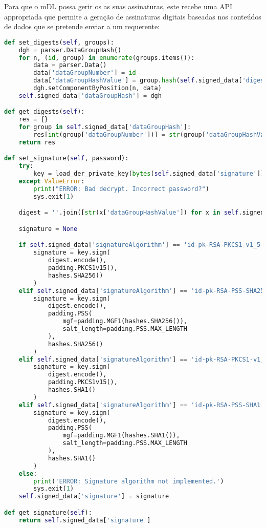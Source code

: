 Para que o mDL possa gerir os as suas assinaturas, este recebe uma API appropriada que permite a geração de assinaturas digitais baseadas nos conteúdos de dados que se pretende enviar a um requerente:

\begin{lstlisting}[caption=Gestão de digests e assinaturas no EF.SOD, language=Python]
    def set_digests(self, groups):
    dgh = parser.DataGroupHash()
    for n, (id, group) in enumerate(groups.items()):
        data = parser.Data()
        data['dataGroupNumber'] = id
        data['dataGroupHashValue'] = group.hash(self.signed_data['digestAlgorithm'])
        dgh.setComponentByPosition(n, data)
    self.signed_data['dataGroupHash'] = dgh

def get_digests(self):
    res = {}
    for group in self.signed_data['dataGroupHash']:
        res[int(group['dataGroupNumber'])] = str(group['dataGroupHashValue'])
    return res

def set_signature(self, password):
    try:
        key = load_der_private_key(bytes(self.signed_data['signature']), password=password, backend=default_backend())
    except ValueError:
        print("ERROR: Bad decrypt. Incorrect password?")
        sys.exit(1)

    digest = ''.join([str(x['dataGroupHashValue']) for x in self.signed_data['dataGroupHash']])

    signature = None

    if self.signed_data['signatureAlgorithm'] == 'id-pk-RSA-PKCS1-v1_5-SHA256':
        signature = key.sign(
            digest.encode(),
            padding.PKCS1v15(),
            hashes.SHA256()
        )
    elif self.signed_data['signatureAlgorithm'] == 'id-pk-RSA-PSS-SHA256':
        signature = key.sign(
            digest.encode(),
            padding.PSS(
                mgf=padding.MGF1(hashes.SHA256()),
                salt_length=padding.PSS.MAX_LENGTH
            ),
            hashes.SHA256()
        )
    elif self.signed_data['signatureAlgorithm'] == 'id-pk-RSA-PKCS1-v1_5-SHA1':
        signature = key.sign(
            digest.encode(),
            padding.PKCS1v15(),
            hashes.SHA1()
        )
    elif self.signed_data['signatureAlgorithm'] == 'id-pk-RSA-PSS-SHA1':
        signature = key.sign(
            digest.encode(),
            padding.PSS(
                mgf=padding.MGF1(hashes.SHA1()),
                salt_length=padding.PSS.MAX_LENGTH
            ),
            hashes.SHA1()
        )
    else:
        print('ERROR: Signature algorithm not implemented.')
        sys.exit(1)
    self.signed_data['signature'] = signature

def get_signature(self):
    return self.signed_data['signature']
\end{lstlisting}